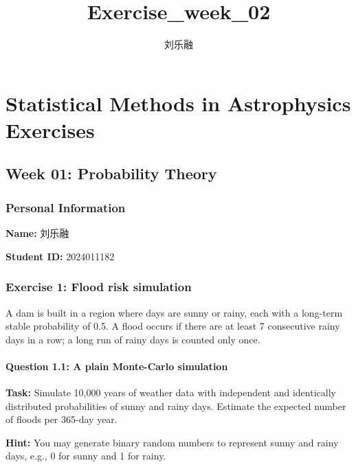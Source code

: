 \documentclass[11pt]{article}
\author{刘乐融}
\title{Exercise\_week\_02}
\begin{document}
    
    \maketitle
    
    

    
    \section{Statistical Methods in Astrophysics
Exercises}\label{statistical-methods-in-astrophysics-exercises}

\subsection{Week 01: Probability
Theory}\label{week-01-probability-theory}

\subsubsection{Personal Information}\label{personal-information}

\textbf{Name:} 刘乐融

\textbf{Student ID:} 2024011182

    \subsubsection{Exercise 1: Flood risk
simulation}\label{exercise-1-flood-risk-simulation}

A dam is built in a region where days are sunny or rainy, each with a
long-term stable probability of 0.5. A flood occurs if there are at
least 7 consecutive rainy days in a row; a long run of rainy days is
counted only once.

\paragraph{Question 1.1: A plain Monte-Carlo
simulation}\label{question-1.1-a-plain-monte-carlo-simulation}

\textbf{Task:} Simulate 10,000 years of weather data with independent
and identically distributed probabilities of sunny and rainy days.
Estimate the expected number of floods per 365-day year.

\textbf{Hint:} You may generate binary random numbers to represent sunny
and rainy days, e.g., 0 for sunny and 1 for rainy.
\end{document}
